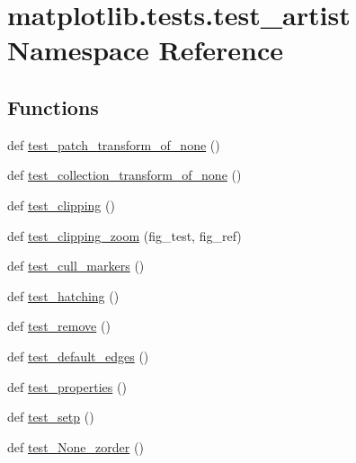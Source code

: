 \hypertarget{namespacematplotlib_1_1tests_1_1test__artist}{}\section{matplotlib.\+tests.\+test\+\_\+artist Namespace Reference}
\label{namespacematplotlib_1_1tests_1_1test__artist}
\subsection*{Functions}
\begin{DoxyCompactItemize}
\item 
def \hyperlink{namespacematplotlib_1_1tests_1_1test__artist_aa4cdedab9e7c1b15b13cbf270f2f7dde}{test\+\_\+patch\+\_\+transform\+\_\+of\+\_\+none} ()
\item 
def \hyperlink{namespacematplotlib_1_1tests_1_1test__artist_aeed76f6a872ec7ed54f7b3d1d106e702}{test\+\_\+collection\+\_\+transform\+\_\+of\+\_\+none} ()
\item 
def \hyperlink{namespacematplotlib_1_1tests_1_1test__artist_a6d48a80212bfb8defc8bf28dbf7f8932}{test\+\_\+clipping} ()
\item 
def \hyperlink{namespacematplotlib_1_1tests_1_1test__artist_a653471c465b377dbdbcd78b1c579f5f7}{test\+\_\+clipping\+\_\+zoom} (fig\+\_\+test, fig\+\_\+ref)
\item 
def \hyperlink{namespacematplotlib_1_1tests_1_1test__artist_aedb0e2a1f555a1a0afa1830c0602079f}{test\+\_\+cull\+\_\+markers} ()
\item 
def \hyperlink{namespacematplotlib_1_1tests_1_1test__artist_ab8b7eddd2e292b1bd534b2f0ff18e490}{test\+\_\+hatching} ()
\item 
def \hyperlink{namespacematplotlib_1_1tests_1_1test__artist_a3be1692010506ce6ad57125e59263150}{test\+\_\+remove} ()
\item 
def \hyperlink{namespacematplotlib_1_1tests_1_1test__artist_a6d94cae5fd3dc578de440efd222e9b43}{test\+\_\+default\+\_\+edges} ()
\item 
def \hyperlink{namespacematplotlib_1_1tests_1_1test__artist_a067ec295b4cf59dfafea08b7e019415e}{test\+\_\+properties} ()
\item 
def \hyperlink{namespacematplotlib_1_1tests_1_1test__artist_a59c96fe1f15be2e53c9fe28900118472}{test\+\_\+setp} ()
\item 
def \hyperlink{namespacematplotlib_1_1tests_1_1test__artist_a73985533593cd02271eb26c5a86381e9}{test\+\_\+\+None\+\_\+zorder} ()

\end{DoxyCompactItemize}
